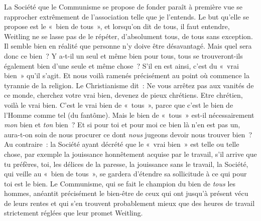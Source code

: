 \documentclass[french,twoside]{book} %
\begin{document}
La Société que le Communisme se propose de fonder paraît à première vue se rapprocher extrêmement de l’association telle que je l’entends. Le but qu’elle se propose est le « bien de tous », et lorsqu’on dit de tous, il faut entendre, Weitling ne se lasse pas de le répéter, d’absolument tous, de tous sans exception. Il semble bien en réalité que personne n’y doive être désavantagé. Mais quel sera donc ce bien ? Y a-t-il un seul et même bien pour tous, tous se trouveront-ils également bien d’une seule et même chose ? S’il en est ainsi, c’est du « vrai bien » qu’il s’agit. Et nous voilà ramenés précisément au point où commence la tyrannie de la religion. Le Christianisme dit : Ne vous arrêtez pas aux vanités de ce monde, cherchez votre vrai bien, devenez de pieux chrétiens. Etre chrétien, voilà le vrai bien. C’est le vrai bien de « tous », parce que c’est le bien de l’Homme comme tel (du fantôme). Mais le bien de « tous » est-il nécessairement \emph{mon} bien et \emph{ton} bien ? Et si pour toi et pour moi ce bien là n’en est pas un, aura-t-on soin de nous procurer ce dont \emph{nous} jugeons devoir nous trouver bien ? Au contraire : la Société ayant décrété que le « vrai bien » est telle ou telle chose, par exemple la jouissance honnêtement acquise par le travail, s’il arrive que tu préfères, toi, les délices de la paresse, la jouissance sans le travail, la Société, qui veille au « bien de tous », se gardera d’étendre sa sollicitude à ce qui pour toi est le bien. Le Communisme, qui se fait le champion du bien de \emph{tous} les hommes, anéantit précisément le bien-être de ceux qui ont jusqu’à présent vécu de leurs rentes et qui s’en trouvent probablement mieux que des heures de travail strictement réglées que leur promet Weitling.\par
\end{document}
